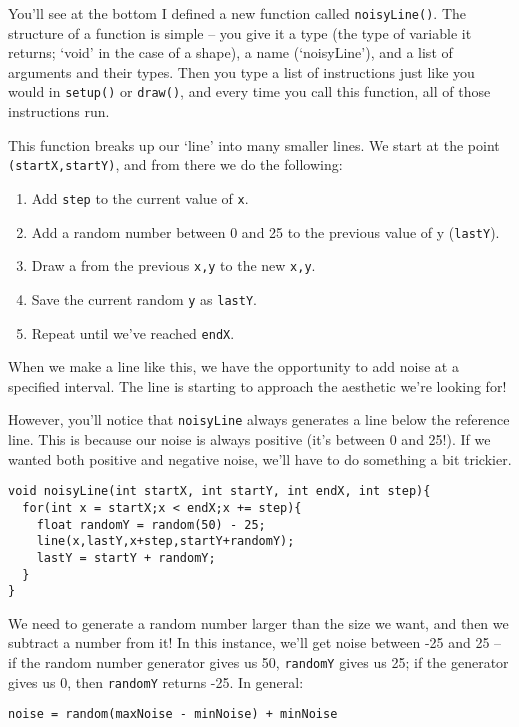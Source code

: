 You'll see at the bottom I defined a new function called \texttt{noisyLine()}.  The structure of a function is simple -- you give it a type (the type of variable it returns; `void' in the case of a shape), a name (`noisyLine'), and a list of arguments and their types.  Then you type a list of instructions just like you would in \texttt{setup()} or \texttt{draw()}, and every time you call this function, all of those instructions run.

This function breaks up our `line' into many smaller lines.  We start at the point \texttt{(startX,startY)}, and from there we do the following:

\begin{enumerate}
\item Add \texttt{step} to the current value of \texttt{x}.
\item Add a random number between 0 and 25 to the previous value of y (\texttt{lastY}).
\item Draw a from the previous \texttt{x,y} to the new \texttt{x,y}.
\item Save the current random \texttt{y} as \texttt{lastY}.
\item Repeat until we've reached \texttt{endX}.
\end{enumerate}

When we make a line like this, we have the opportunity to add noise at a specified interval.  The line is starting to approach the aesthetic we're looking for!

However, you'll notice that \texttt{noisyLine} always generates a line below the reference line.  This is because our noise is always positive (it's between 0 and 25!).  If we wanted both positive and negative noise, we'll have to do something a bit trickier.

\begin{verbatim}
void noisyLine(int startX, int startY, int endX, int step){
  for(int x = startX;x < endX;x += step){
    float randomY = random(50) - 25;
    line(x,lastY,x+step,startY+randomY);
    lastY = startY + randomY;
  }
}
\end{verbatim}

We need to generate a random number larger than the size we want, and then we subtract a number from it!  In this instance, we'll get noise between -25 and 25 -- if the random number generator gives us 50, \texttt{randomY} gives us 25; if the generator gives us 0, then \texttt{randomY} returns -25.  In general:

\begin{center}
{\tt noise = random(maxNoise - minNoise) + minNoise}
\end{center}

